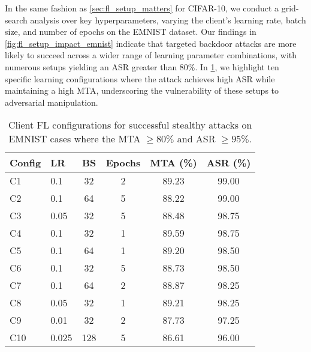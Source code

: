 In the same fashion as \cref{sec:fl_setup_matters} for CIFAR-10, we conduct a grid-search analysis over key hyperparameters, varying the client’s learning rate, batch size, and number of epochs on the EMNIST \citep{cohen2017emnistextensionmnisthandwritten} dataset.
Our findings in \cref{fig:fl_setup_impact_emnist} indicate that targeted backdoor attacks are more likely to succeed across a wider range of learning parameter combinations, with numerous setups yielding an ASR greater than 80\%. In \cref{tab:fl_setup_exps_emnist}, we highlight ten specific learning configurations where the attack achieves high ASR while maintaining a high MTA, underscoring the vulnerability of these setups to adversarial manipulation.

\begin{table}[ht]
    \centering
    \begin{tabular}{llcc|cc}
    \toprule
    \textbf{Config} & \textbf{LR} & \textbf{BS} & \textbf{Epochs} & \textbf{MTA (\%)} & \textbf{ASR (\%)} \\
    \midrule
    C1 & 0.1 & 32 & 2 & 89.23 & 99.00 \\
    C2 & 0.1 & 64 & 5 & 88.22 & 99.00 \\
    C3 & 0.05 & 32 & 5 & 88.48 & 98.75 \\
    C4 & 0.1 & 32 & 1 & 89.59 & 98.75 \\
    C5 & 0.1 & 64 & 1 & 89.20 & 98.50 \\
    C6 & 0.1 & 32 & 5 & 88.73 & 98.50 \\
    C7 & 0.1 & 64 & 2 & 88.87 & 98.25 \\
    C8 & 0.05 & 32 & 1 & 89.21 & 98.25 \\ 
    C9 & 0.01 & 32 & 2 & 87.73 & 97.25 \\
    C10 & 0.025 & 128 & 5 & 86.61 & 96.00 \\
    \bottomrule
    \end{tabular}
    \caption{Client FL configurations for successful stealthy attacks on EMNIST \ie cases where the MTA $\geq 80\%$ and ASR $\geq 95\%$.}
    \label{tab:fl_setup_exps_emnist}
\end{table}
\clearpage
